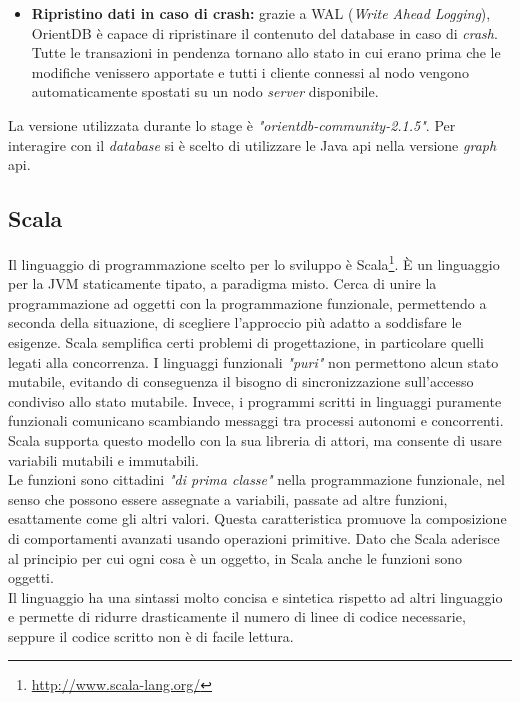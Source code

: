 \begin{itemize}
\newpage
\item \textbf{Ripristino dati in caso di crash:} grazie a WAL (\textit{Write Ahead Logging}), OrientDB è capace di ripristinare il contenuto del database in caso di \textit{crash}. Tutte le transazioni in pendenza tornano allo stato in cui erano prima che le modifiche venissero apportate e tutti i cliente connessi al nodo vengono automaticamente spostati su un nodo \textit{server} disponibile.
\end{itemize}
La versione utilizzata durante lo stage è \textit{"orientdb-community-2.1.5"}. Per interagire con il \textit{database} si è scelto di utilizzare le Java \gls{api} nella versione \textit{graph} \gls{api}.

\subsection*{Scala}
Il linguaggio di programmazione scelto per lo sviluppo è Scala\footnote{\url{http://www.scala-lang.org/}}. È un linguaggio per la \gls{JVM} staticamente tipato, a paradigma misto. Cerca di unire la programmazione ad oggetti con la programmazione funzionale, permettendo a seconda della situazione, di scegliere l'approccio più adatto a soddisfare le esigenze.  Scala semplifica certi problemi di progettazione, in particolare quelli legati alla concorrenza. I linguaggi funzionali \textit{"puri"} non permettono alcun stato mutabile, evitando di conseguenza il bisogno di sincronizzazione sull'accesso condiviso allo stato mutabile. Invece, i programmi scritti in linguaggi puramente funzionali comunicano scambiando messaggi tra processi autonomi e concorrenti. Scala supporta questo modello con la sua libreria di attori, ma consente di usare variabili mutabili e immutabili.\\
Le funzioni sono cittadini \textit{"di prima classe"} nella programmazione funzionale, nel senso che possono essere assegnate a variabili, passate ad altre funzioni, esattamente come gli altri valori. Questa caratteristica promuove la composizione di comportamenti avanzati usando operazioni primitive. Dato che Scala aderisce al principio per cui ogni cosa è un oggetto, in Scala anche le funzioni sono oggetti.\\ Il linguaggio ha una sintassi molto concisa e sintetica rispetto ad altri linguaggio e permette di ridurre drasticamente il numero di linee di codice necessarie, seppure il codice scritto non è di facile lettura.

